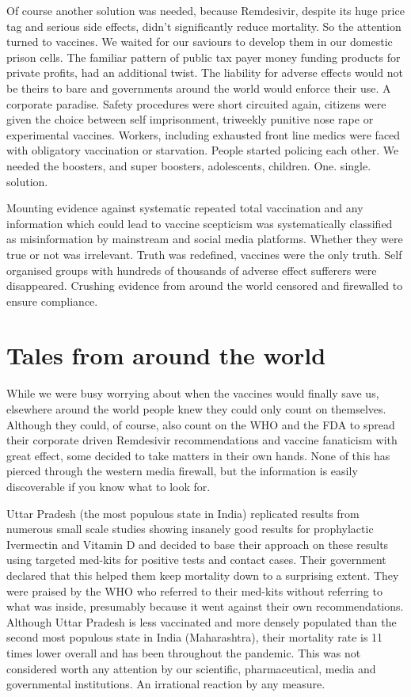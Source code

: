 \documentclass[11pt,a4paper]{article}
\begin{document}
Of course another solution was needed, because Remdesivir, despite its huge price tag and serious side effects, didn’t significantly reduce mortality. So the attention turned to vaccines. We waited for our saviours to develop them in our domestic prison cells. The familiar pattern of public tax payer money funding products for private profits, had an additional twist. The liability for adverse effects would not be theirs to bare and governments around the world would enforce their use. A corporate paradise. Safety procedures were short circuited again, citizens were given the choice between self imprisonment, triweekly punitive nose rape or experimental vaccines. Workers, including exhausted front line medics were faced with obligatory vaccination or starvation. People started policing each other. We needed the boosters, and super boosters, adolescents, children. One. single. solution.

Mounting evidence against systematic repeated total vaccination and any information which could lead to vaccine scepticism was systematically classified as misinformation by mainstream and social media platforms. Whether they were true or not was irrelevant. Truth was redefined, vaccines were the only truth. Self organised groups with hundreds of thousands of adverse effect sufferers were disappeared. Crushing evidence from around the world censored and firewalled to ensure compliance. 

\section*{Tales from around the world}

While we were busy worrying about when the vaccines would finally save us, elsewhere around the world people knew they could only count on themselves. Although they could, of course, also count on the WHO and the FDA to spread their corporate driven Remdesivir recommendations and vaccine fanaticism with great effect, some decided to take matters in their own hands. None of this has pierced through the western media firewall, but the information is easily discoverable if you know what to look for.

Uttar Pradesh (the most populous state in India) replicated results from numerous small scale studies showing insanely good results for prophylactic Ivermectin and Vitamin D and decided to base their approach on these results using targeted med-kits for positive tests and contact cases. Their government declared that this helped them keep mortality down to a surprising extent. They were praised by the WHO who referred to their med-kits without referring to what was inside, presumably because it went against their own recommendations. Although Uttar Pradesh is less vaccinated and more densely populated than the second most populous state in India (Maharashtra), their mortality rate is 11 times lower overall and has been throughout the pandemic. This was not considered worth any attention by our scientific, pharmaceutical, media and governmental institutions. An irrational reaction by any measure.
\end{document}
